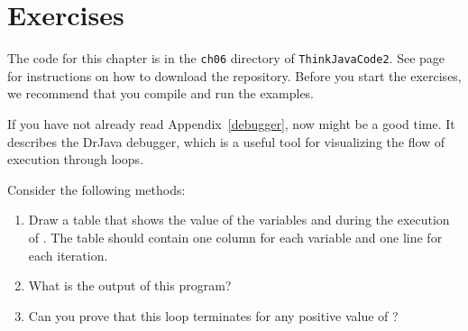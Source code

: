\section{Exercises}

The code for this chapter is in the {\tt ch06} directory of {\tt ThinkJavaCode2}.
See page~\pageref{code} for instructions on how to download the repository.
Before you start the exercises, we recommend that you compile and run the examples.

If you have not already read Appendix~\ref{debugger}, now might be a good time.
It describes the DrJava debugger, which is a useful tool for visualizing the flow of execution through loops.


\begin{exercise}  %

Consider the following methods:


\begin{enumerate}

\item Draw a table that shows the value of the variables  and  during the execution of .
The table should contain one column for each variable and one line for each iteration.

\item What is the output of this program?

\item Can you prove that this loop terminates for any positive value of ?



\end{enumerate}

\end{exercise}


